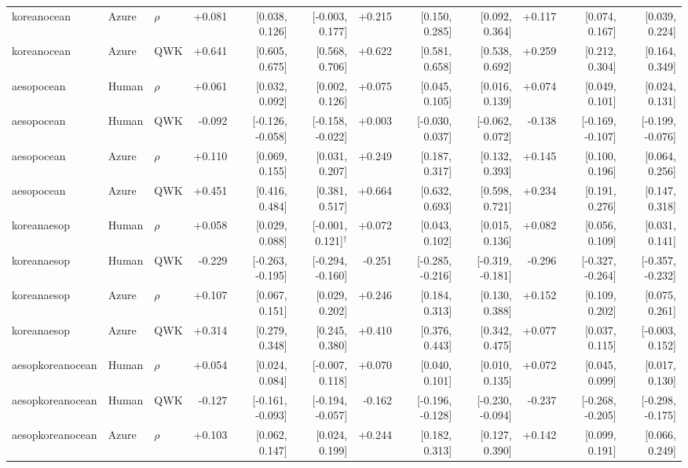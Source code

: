 \documentclass[10pt]{article}
\begin{document}
\begin{landscape}
\begin{longtable}{@{}lllrrrrrrrrr@{}}
koreanocean & Azure & $\rho$ & +0.081 & [0.038, 0.126] & [-0.003, 0.177] & +0.215 & [0.150, 0.285] & [0.092, 0.364] & +0.117 & [0.074, 0.167] & [0.039, 0.224]\\
koreanocean & Azure & QWK & +0.641 & [0.605, 0.675] & [0.568, 0.706] & +0.622 & [0.581, 0.658] & [0.538, 0.692] & +0.259 & [0.212, 0.304] & [0.164, 0.349]\\
\addlinespace[2pt]
aesopocean & Human & $\rho$ & +0.061 & [0.032, 0.092] & [0.002, 0.126] & +0.075 & [0.045, 0.105] & [0.016, 0.139] & +0.074 & [0.049, 0.101] & [0.024, 0.131]\\
aesopocean & Human & QWK & -0.092 & [-0.126, -0.058] & [-0.158, -0.022] & +0.003 & [-0.030, 0.037] & [-0.062, 0.072] & -0.138 & [-0.169, -0.107] & [-0.199, -0.076]\\
aesopocean & Azure & $\rho$ & +0.110 & [0.069, 0.155] & [0.031, 0.207] & +0.249 & [0.187, 0.317] & [0.132, 0.393] & +0.145 & [0.100, 0.196] & [0.064, 0.256]\\
aesopocean & Azure & QWK & +0.451 & [0.416, 0.484] & [0.381, 0.517] & +0.664 & [0.632, 0.693] & [0.598, 0.721] & +0.234 & [0.191, 0.276] & [0.147, 0.318]\\
\addlinespace[2pt]
koreanaesop & Human & $\rho$ & +0.058 & [0.029, 0.088] & [-0.001, 0.121]$^{\dagger}$ & +0.072 & [0.043, 0.102] & [0.015, 0.136] & +0.082 & [0.056, 0.109] & [0.031, 0.141]\\
koreanaesop & Human & QWK & -0.229 & [-0.263, -0.195] & [-0.294, -0.160] & -0.251 & [-0.285, -0.216] & [-0.319, -0.181] & -0.296 & [-0.327, -0.264] & [-0.357, -0.232]\\
koreanaesop & Azure & $\rho$ & +0.107 & [0.067, 0.151] & [0.029, 0.202] & +0.246 & [0.184, 0.313] & [0.130, 0.388] & +0.152 & [0.109, 0.202] & [0.075, 0.261]\\
koreanaesop & Azure & QWK & +0.314 & [0.279, 0.348] & [0.245, 0.380] & +0.410 & [0.376, 0.443] & [0.342, 0.475] & +0.077 & [0.037, 0.115] & [-0.003, 0.152]\\
\addlinespace[2pt]
aesopkoreanocean & Human & $\rho$ & +0.054 & [0.024, 0.084] & [-0.007, 0.118] & +0.070 & [0.040, 0.101] & [0.010, 0.135] & +0.072 & [0.045, 0.099] & [0.017, 0.130]\\
aesopkoreanocean & Human & QWK & -0.127 & [-0.161, -0.093] & [-0.194, -0.057] & -0.162 & [-0.196, -0.128] & [-0.230, -0.094] & -0.237 & [-0.268, -0.205] & [-0.298, -0.175]\\
aesopkoreanocean & Azure & $\rho$ & +0.103 & [0.062, 0.147] & [0.024, 0.199] & +0.244 & [0.182, 0.313] & [0.127, 0.390] & +0.142 & [0.099, 0.191] & [0.066, 0.249]\\

\end{longtable}
\end{landscape}
\end{document}
